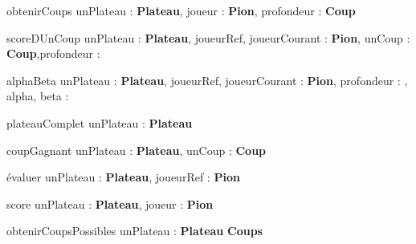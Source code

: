 \begin{algorithme}
	\signaturefonction
	{obtenirCoups}
	{unPlateau : \textbf{Plateau}, joueur : \textbf{Pion}, profondeur : \naturel}
	{\textbf{Coup}}

	\vspace*{5mm}

	\signaturefonction
	{scoreDUnCoup}
	{unPlateau : \textbf{Plateau}, joueurRef, joueurCourant : \textbf{Pion}, unCoup : \textbf{Coup},profondeur : \naturel}
	{\entier}
	
	\vspace*{5mm}
	
	\signaturefonction
	{alphaBeta}
	{unPlateau : \textbf{Plateau}, joueurRef, joueurCourant : \textbf{Pion}, profondeur : \naturel, alpha, beta : \entier}
	{\entier}
	
	\vspace*{5mm}
	
	\signaturefonction
	{plateauComplet}
	{unPlateau : \textbf{Plateau}}
	{\booleen}
	
	\vspace*{5mm}
	
	\signaturefonction
	{coupGagnant}
	{unPlateau : \textbf{Plateau}, unCoup : \textbf{Coup}}
	{\booleen}
	
	\vspace*{5mm}
	
	\signaturefonction
	{évaluer}
	{unPlateau : \textbf{Plateau}, joueurRef : \textbf{Pion}}
	{\entier}
	
	\vspace*{5mm}
	
	\signaturefonction
	{score}
	{unPlateau : \textbf{Plateau}, joueur : \textbf{Pion}}
	{\entier}
	
	\vspace*{5mm}
	
	\signaturefonction
	{obtenirCoupsPossibles}
	{unPlateau : \textbf{Plateau}}
	{\textbf{Coups}}
	

	
\end{algorithme}

	

